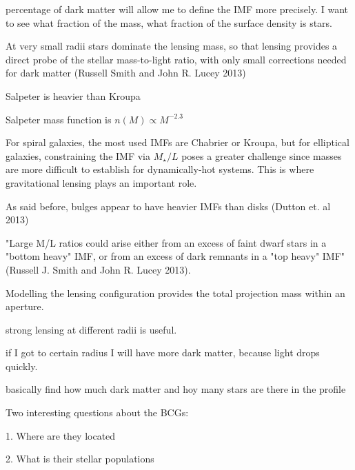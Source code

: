 percentage of dark matter will allow me to define the IMF more precisely. I want to see what fraction of the mass, what fraction of the surface density is stars. 

At very small radii stars dominate the lensing mass, so that lensing provides a direct probe of the stellar mass-to-light ratio, with only small corrections needed for dark matter (Russell Smith and John R. Lucey 2013)

Salpeter is heavier than Kroupa 

Salpeter mass function is $n(M)\propto M^{-2.3}$ 

For spiral galaxies, the most used IMFs are Chabrier or Kroupa, but for elliptical galaxies, constraining the IMF via $M_{\star}/L$ poses a greater challenge since masses are more difficult to establish for dynamically-hot systems. This is where gravitational lensing plays an important role.

As said before, bulges appear to have heavier IMFs than disks (Dutton et. al 2013)

"Large M/L ratios could arise either from an excess of faint dwarf stars in a "bottom heavy" IMF, or from an excess of dark remnants in a "top heavy" IMF" (Russell J. Smith and John R. Lucey 2013).

Modelling the lensing configuration provides the total projection mass within an aperture.

strong lensing at different radii is useful.

if I got to certain radius I will have more dark matter, because light drops quickly. 

basically find how much dark matter and hoy many stars are there in the profile

Two interesting questions about the BCGs:

1. Where are they located

2. What is their stellar populations




\newpage
